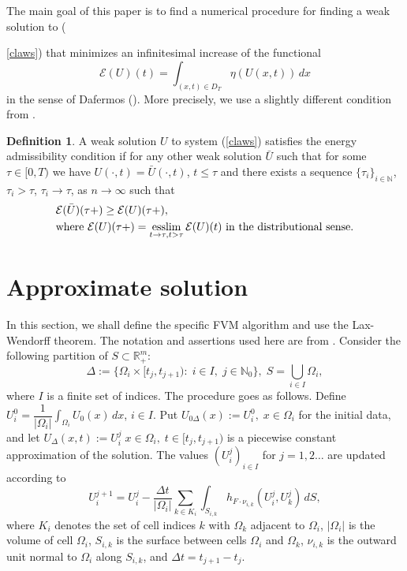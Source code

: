 \documentclass[11pt,a4paper,reqno]{amsart}
\theoremstyle{plain}
\theoremstyle{definition}
\newtheorem{definition}{Definition}[section]
\theoremstyle{remark}
\numberwithin{equation}{section}
\begin{document}
The main goal of this paper is to find a numerical procedure for finding a weak
solution to ({\ref{claws}) that minimizes an infinitesimal increase of the functional  
\[
\mathcal{E}(U)(t)=\int_{(x,t)\in D_{T}}\eta(U(x,t))\, dx
\] 
in the sense of Dafermos (\cite{CD_1973}). More precisely, we use a slightly different condition from \cite{F2014}.
 
\begin{definition} \label{def-dafermos}
A weak solution $U$ to system (\ref{claws}) satisfies the energy
admissibility condition if for any other weak solution
$\bar{U}$ such that for some $\tau\in [0,T)$ we have
$U(\cdot,t)=\bar{U}(\cdot,t)$, $t\leq \tau$ and 
there exists a sequence $\{\tau_{i} \}_{i \in \mathbb{N}}$, $\tau_{i}>\tau$,
$\tau_{i}\to \tau$, as $n\to \infty$ such that
\[
\begin{split}
& \mathcal{E}(\bar{U})(\tau +)\geq \mathcal{E}(U)(\tau +), \\ 
& \text{where }
\mathcal{E}(U)(\tau +)=\mathop{\rm esslim}_{t \to \tau, t>\tau}\mathcal{E}(U)(t)
\text{ in the distributional sense}.
\end{split}
\]
\end{definition}

\section{Approximate solution}

In this section, we shall define the specific FVM algorithm
and use the Lax-Wendorff theorem. 
The notation and assertions used here are from 
\cite{jegdic}.
Consider the following  partition of $S\subset \mathbb{R}_{+}^{m}$:
\[
\Delta:=\{ \Omega_{i}\times [ t_{j},t_{j+1}) :\; i\in I,\; j\in \mathbb{N}_{0}\},
\; S=\bigcup_{i\in I}\Omega _{i},
\]
where $I$ is a  finite set of indices. The procedure  
goes as follows. 
Define 
$U_{i}^{0}=\dfrac{1}{|\Omega_{i}|} \int_{\Omega_{i}} U_{0}(x) \, dx$, $i\in I$.
Put $U_{0\Delta}(x):=U_{i}^{0},\; x\in \Omega_{i}$ for the initial data, and 
let $U_{\Delta}(x,t):=U_{i}^{j} \; x\in \Omega_{i},\; t\in [t_{j},t_{j+1})$ 
is a piecewise constant approximation of the solution. 
The values $(U_{i}^{j})_{i\in I}$ for $j=1,2\ldots$ are updated according to 
\begin{equation} \label{shceme}
U_{i}^{j+1}=U_{i}^{j}-\dfrac{\Delta t}{|\Omega _{i}| }
\sum_{k\in K_{i}}\int_{S_{i,k}}h_{F\cdot \nu_{i,k}}(U_{i}^{j},U_{k}^{j})\, dS,
\end{equation}
where $K_{i}$ denotes the set of cell indices $k$ with $\Omega_{k}$ adjacent to 
$\Omega_{i}$, $|\Omega_{i}|$ is the volume of cell $\Omega_{i}$, $S_{i,k}$ is 
the surface between cells $\Omega_{i}$ and $\Omega_{k}$, $\nu_{i,k}$ 
is the outward unit normal to $\Omega_{i}$ along $S_{i,k}$, 
and $\Delta t=t_{j+1}-t_{j}$.

}
\end{document}
